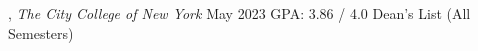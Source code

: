 

, \textit{The City College of New York} \hfill	May 2023
\newline
GPA: 3.86 / 4.0
\newline
Dean's List (All Semesters)

